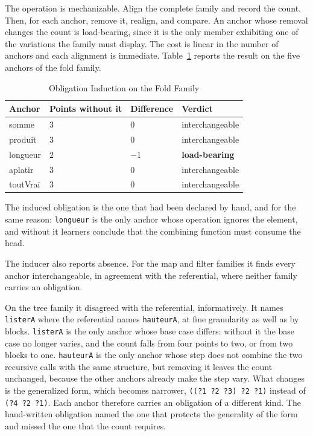 \documentclass[journal]{IEEEtran}
\begin{document}
The operation is mechanizable. Align the complete family and record the count. Then, for each anchor, remove it, realign, and compare. An anchor whose removal changes the count is load-bearing, since it is the only member exhibiting one of the variations the family must display. The cost is linear in the number of anchors and each alignment is immediate. Table~\ref{tab:3} reports the result on the five anchors of the fold family.

\begin{table}[t]
\centering\scriptsize\setlength{\tabcolsep}{3pt}
\caption{Obligation Induction on the Fold Family}\label{tab:3}
\begin{tabular}{@{}p{0.70in}p{0.80in}p{0.70in}p{1.02in}@{}}
\toprule
Anchor & Points without it & Difference & Verdict \\
\midrule
somme & 3 & 0 & interchangeable \\
produit & 3 & 0 & interchangeable \\
longueur & 2 & $-$1 & \textbf{load-bearing} \\
aplatir & 3 & 0 & interchangeable \\
toutVrai & 3 & 0 & interchangeable \\
\bottomrule
\end{tabular}
\end{table}

The induced obligation is the one that had been declared by hand, and
for the same reason: \texttt{longueur} is the only anchor whose
operation ignores the element, and without it learners conclude that the
combining function must consume the head.

The inducer also reports absence. For the map and filter
families it finds every anchor interchangeable, in agreement with the
referential, where neither family carries an obligation.

On the tree family it disagreed with the referential, informatively. It
names \texttt{listerA} where the referential names \texttt{hauteurA}, at
fine granularity as well as by blocks. \texttt{listerA} is the only
anchor whose base case differs: without it the base case no longer
varies, and the count falls from four points to two, or from two blocks
to one. \texttt{hauteurA} is the only anchor whose step does not combine
the two recursive calls with the same structure, but removing it leaves
the count unchanged, because the other anchors already make the step
vary. What changes is the generalized form, which becomes narrower,
\texttt{((?1 ?2 ?3) ?2 ?1)} instead of \texttt{(?4 ?2 ?1)}. Each anchor
therefore carries an obligation of a different kind. The hand-written
obligation named the one that protects the generality of the form and
missed the one that the count requires.
\end{document}
